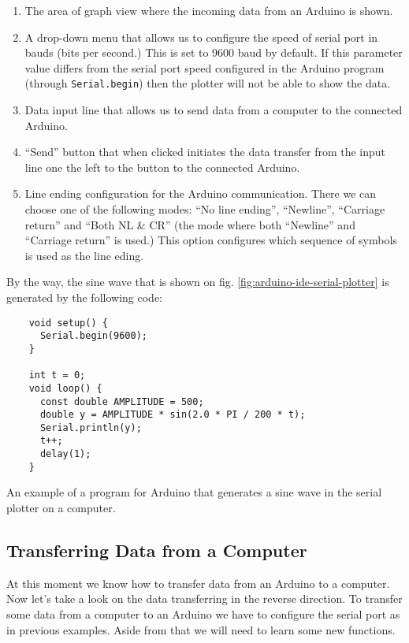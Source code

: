 \documentclass[../sparc.tex]{subfiles}
\begin{document}
\begin{enumerate}
\item The area of graph view where the incoming data from an Arduino is shown.
\item A drop-down menu that allows us to configure the speed of serial port in
  bauds (bits per second.)  This is set to 9600 baud by default.  If this
  parameter value differs from the serial port speed configured in the Arduino
  program (through \texttt{Serial.begin}) then the plotter will not be able to
  show the data.
\item Data input line that allows us to send data from a computer to the
  connected Arduino.
\item ``Send'' button that when clicked initiates the data transfer from the
  input line one the left to the button to the connected Arduino.
\item Line ending configuration for the Arduino communication.  There we can
  choose one of the following modes: ``No line ending'', ``Newline'', ``Carriage
  return'' and ``Both NL \& CR'' (the mode where both ``Newline'' and ``Carriage
  return'' is used.)  This option configures which sequence of symbols is used
  as the line eding.
\end{enumerate}

\newpage

By the way, the sine wave that is shown on fig.
\ref{fig:arduino-ide-serial-plotter} is generated by the following code:

\begin{listing}[ht]
  \begin{verbatim}
    void setup() {
      Serial.begin(9600);
    }

    int t = 0;
    void loop() {
      const double AMPLITUDE = 500;
      double y = AMPLITUDE * sin(2.0 * PI / 200 * t);
      Serial.println(y);
      t++;
      delay(1);
    }
  \end{verbatim}
  \label{listing:serial-port-sine-wave-example}
  \caption{An example of a program for Arduino that generates a sine wave in the
    serial plotter on a computer.}
\end{listing}

\subsection{Transferring Data from a Computer}

At this moment we know how to transfer data from an Arduino to a computer. Now
let's take a look on the data transferring in the reverse direction. To transfer
some data from a computer to an Arduino we have to configure the serial port as
in previous examples.  Aside from that we will need to learn some new functions.
\end{document}

